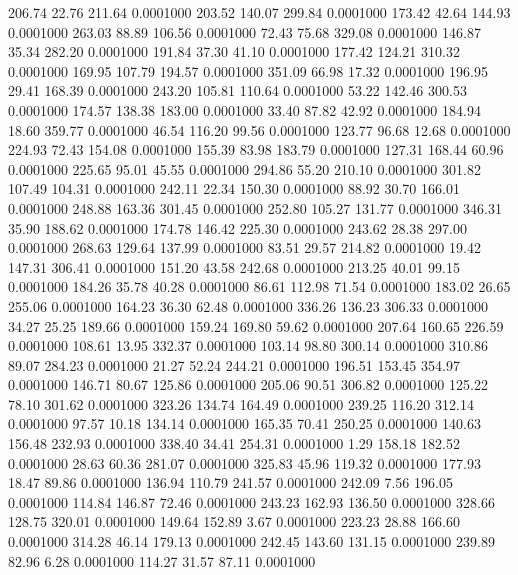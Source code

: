  206.74   22.76  211.64   0.0001000
 203.52  140.07  299.84   0.0001000
 173.42   42.64  144.93   0.0001000
 263.03   88.89  106.56   0.0001000
  72.43   75.68  329.08   0.0001000
 146.87   35.34  282.20   0.0001000
 191.84   37.30   41.10   0.0001000
 177.42  124.21  310.32   0.0001000
 169.95  107.79  194.57   0.0001000
 351.09   66.98   17.32   0.0001000
 196.95   29.41  168.39   0.0001000
 243.20  105.81  110.64   0.0001000
  53.22  142.46  300.53   0.0001000
 174.57  138.38  183.00   0.0001000
  33.40   87.82   42.92   0.0001000
 184.94   18.60  359.77   0.0001000
  46.54  116.20   99.56   0.0001000
 123.77   96.68   12.68   0.0001000
 224.93   72.43  154.08   0.0001000
 155.39   83.98  183.79   0.0001000
 127.31  168.44   60.96   0.0001000
 225.65   95.01   45.55   0.0001000
 294.86   55.20  210.10   0.0001000
 301.82  107.49  104.31   0.0001000
 242.11   22.34  150.30   0.0001000
  88.92   30.70  166.01   0.0001000
 248.88  163.36  301.45   0.0001000
 252.80  105.27  131.77   0.0001000
 346.31   35.90  188.62   0.0001000
 174.78  146.42  225.30   0.0001000
 243.62   28.38  297.00   0.0001000
 268.63  129.64  137.99   0.0001000
  83.51   29.57  214.82   0.0001000
  19.42  147.31  306.41   0.0001000
 151.20   43.58  242.68   0.0001000
 213.25   40.01   99.15   0.0001000
 184.26   35.78   40.28   0.0001000
  86.61  112.98   71.54   0.0001000
 183.02   26.65  255.06   0.0001000
 164.23   36.30   62.48   0.0001000
 336.26  136.23  306.33   0.0001000
  34.27   25.25  189.66   0.0001000
 159.24  169.80   59.62   0.0001000
 207.64  160.65  226.59   0.0001000
 108.61   13.95  332.37   0.0001000
 103.14   98.80  300.14   0.0001000
 310.86   89.07  284.23   0.0001000
  21.27   52.24  244.21   0.0001000
 196.51  153.45  354.97   0.0001000
 146.71   80.67  125.86   0.0001000
 205.06   90.51  306.82   0.0001000
 125.22   78.10  301.62   0.0001000
 323.26  134.74  164.49   0.0001000
 239.25  116.20  312.14   0.0001000
  97.57   10.18  134.14   0.0001000
 165.35   70.41  250.25   0.0001000
 140.63  156.48  232.93   0.0001000
 338.40   34.41  254.31   0.0001000
   1.29  158.18  182.52   0.0001000
  28.63   60.36  281.07   0.0001000
 325.83   45.96  119.32   0.0001000
 177.93   18.47   89.86   0.0001000
 136.94  110.79  241.57   0.0001000
 242.09    7.56  196.05   0.0001000
 114.84  146.87   72.46   0.0001000
 243.23  162.93  136.50   0.0001000
 328.66  128.75  320.01   0.0001000
 149.64  152.89    3.67   0.0001000
 223.23   28.88  166.60   0.0001000
 314.28   46.14  179.13   0.0001000
 242.45  143.60  131.15   0.0001000
 239.89   82.96    6.28   0.0001000
 114.27   31.57   87.11   0.0001000
